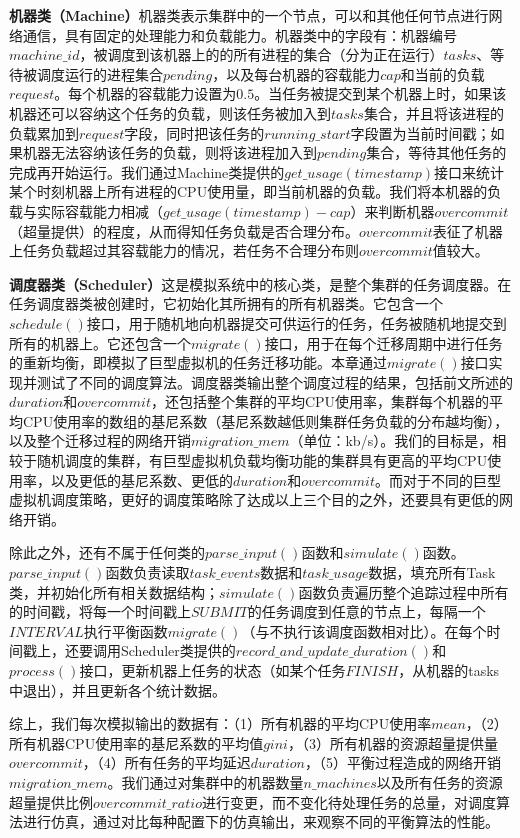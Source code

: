 \noindent\textbf{机器类（Machine）}\quad \label{chap:machine}机器类表示集群中的一个节点，可以和其他任何节点进行网络通信，具有固定的处理能力和负载能力。机器类中的字段有：机器编号$machine\_id$，被调度到该机器上的的所有进程的集合（分为正在运行）$tasks$、等待被调度运行的进程集合$pending$，以及每台机器的容载能力$cap$和当前的负载$request$。每个机器的容载能力设置为$0.5$。当任务被提交到某个机器上时，如果该机器还可以容纳这个任务的负载，则该任务被加入到$tasks$集合，并且将该进程的负载累加到$request$字段，同时把该任务的$running\_start$字段置为当前时间戳；如果机器无法容纳该任务的负载，则将该进程加入到$pending$集合，等待其他任务的完成再开始运行。我们通过Machine类提供的$get\_usage(timestamp)$接口来统计某个时刻机器上所有进程的CPU使用量，即当前机器的负载。我们将本机器的负载与实际容载能力相减（$get\_usage(timestamp) - cap$）来判断机器$overcommit$（超量提供）的程度，从而得知任务负载是否合理分布。$overcommit$表征了机器上任务负载超过其容载能力的情况，若任务不合理分布则$overcommit$值较大。

\noindent\textbf{调度器类（Scheduler）}\quad \label{chap:scheduler}这是模拟系统中的核心类，是整个集群的任务调度器。在任务调度器类被创建时，它初始化其所拥有的所有机器类。它包含一个$schedule()$接口，用于随机地向机器提交可供运行的任务，任务被随机地提交到所有的机器上。它还包含一个$migrate()$接口，用于在每个迁移周期中进行任务的重新均衡，即模拟了巨型虚拟机的任务迁移功能。本章通过$migrate()$接口实现并测试了不同的调度算法。调度器类输出整个调度过程的结果，包括前文所述的$duration$和$overcommit$，还包括整个集群的平均CPU使用率，集群每个机器的平均CPU使用率的数组的基尼系数（基尼系数越低则集群任务负载的分布越均衡），以及整个迁移过程的网络开销$migration\_mem$（单位：kb/s）。我们的目标是，相较于随机调度的集群，有巨型虚拟机负载均衡功能的集群具有更高的平均CPU使用率，以及更低的基尼系数、更低的$duration$和$overcommit$。而对于不同的巨型虚拟机调度策略，更好的调度策略除了达成以上三个目的之外，还要具有更低的网络开销。

除此之外，还有不属于任何类的$parse\_input()$函数和$simulate()$函数。$parse\_input()$函数负责读取$task\_events$数据和$task\_usage$数据，填充所有Task类，并初始化所有相关数据结构；$simulate()$函数负责遍历整个追踪过程中所有的时间戳，将每一个时间戳上$SUBMIT$的任务调度到任意的节点上，每隔一个$INTERVAL$执行平衡函数$migrate()$（与不执行该调度函数相对比）。在每个时间戳上，还要调用Scheduler类提供的$record\_and\_update\_duration()$和$process()$接口，更新机器上任务的状态（如某个任务$FINISH$，从机器的tasks中退出），并且更新各个统计数据。

综上，我们每次模拟输出的数据有：（1）所有机器的平均CPU使用率$mean$，（2）所有机器CPU使用率的基尼系数的平均值$gini$，（3）所有机器的资源超量提供量$overcommit$，（4）所有任务的平均延迟$duration$，（5）平衡过程造成的网络开销$migration\_mem$。我们通过对集群中的机器数量$n\_machines$以及所有任务的资源超量提供比例$overcommit\_ratio$进行变更，而不变化待处理任务的总量，对调度算法进行仿真，通过对比每种配置下的仿真输出，来观察不同的平衡算法的性能。

